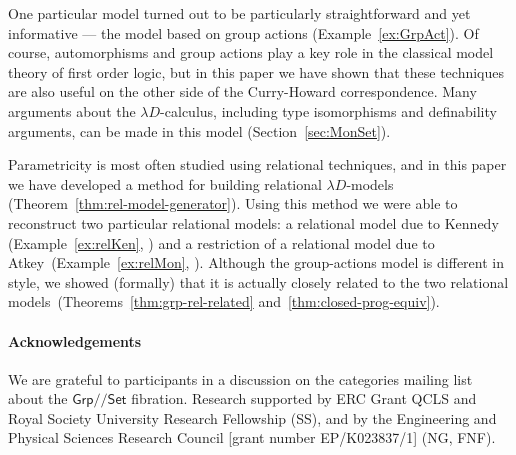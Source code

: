 \documentclass[a4paper,UKenglish]{lipics}
\theoremstyle{plain}
\newcommand{\msf}[1]{\mathsf{#1}} %
\newcommand{\Grp}{\msf{Grp}}
\newcommand{\Set}{\msf{Set}}
\newcommand{\Lslice}[1]{#1/\!/\Set}
\newcommand{\GrpSet}{\Lslice{\Grp}}
\begin{document}
One particular model turned out to be particularly straightforward and yet informative --- the model based on group actions (Example~\ref{ex:GrpAct}). Of course, automorphisms and group actions play a key role in the classical model theory of first order logic, but in this paper we have shown that these techniques are also useful on the other side of the Curry-Howard correspondence. Many arguments about the $\lambda D$-calculus, including type isomorphisms and definability arguments, can be made in this model (Section~\ref{sec:MonSet}).

Parametricity is most often studied using relational techniques, and in this paper we have developed a method for building relational $\lambda D$-models (Theorem~\ref{thm:rel-model-generator}). Using this method we were able to reconstruct two particular relational models: a relational model due to Kennedy (Example~\ref{ex:relKen}, \cite{Kennedy:1997:RPU:263699.263761}) and a restriction of a relational model due to Atkey~(Example~\ref{ex:relMon}, \cite{atkey14conservation}). Although the group-actions model is different in style, we showed (formally) that it is actually closely related to the two relational models~(Theorems~\ref{thm:grp-rel-related} and~\ref{thm:closed-prog-equiv}).


\paragraph*{Acknowledgements}
We are grateful to participants in a discussion on the categories
mailing list about the $\GrpSet$ fibration.  Research supported by ERC
Grant QCLS and Royal Society University Research Fellowship (SS), and
by the Engineering and Physical Sciences Research Council [grant
number EP/K023837/1] (NG, FNF).


\end{document}

